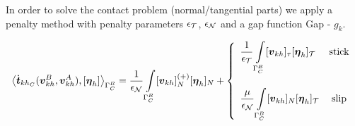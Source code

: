\documentclass[12pt,a4paper]{scrbook}
\begin{document}
% 
%  
%  
%  
%  
%  
%  
%  
%  
%  
% 
% 
In order to solve the contact problem  (normal/tangential parts) we apply a penalty method with penalty  parameters  $\epsilon_{{\mathcal{T}}}$, $\epsilon_{{\mathcal{N}}}$ and a gap function Gap - $g_k$.

\begin{equation}\label{DotP}
\left\langle\dot{\mbox{\boldmath$t$}}_{kh_{C}} (\mbox{\boldmath$v$}_{kh}^{B},\mbox{\boldmath$v$}_{kh}^{A}), [\mbox{\boldmath$\eta$}_h]\right\rangle_{\Gamma^{B}_{C}}=\frac{1}{\epsilon_{{\mathcal{N}}}}\int\limits_{\Gamma^{B}_{C}} [\mbox{\boldmath$v$}_{kh}]^{(+)}_N[\mbox{\boldmath$\eta$}_h]_N+
\left\{
\begin{array}{lc}
\displaystyle\frac{1}{\epsilon_{{\mathcal{T}}}}\int\limits_{\Gamma^{B}_{C}} [\mbox{\boldmath$v$}_{kh}]_{\tau} [\mbox{\boldmath$\eta$}_h]_{{\mathcal{T}}}& \mbox{stick}\\[7ex]
\displaystyle\frac{\mu}{\epsilon_{{\mathcal{N}}}}\int\limits_{\Gamma^{B}_{C}} [\mbox{\boldmath$v$}_{kh}]_{N} [\mbox{\boldmath$\eta$}_h]_{{\mathcal{T}}}& \mbox{slip}
\end{array}
\right.
\end{equation}
\end{document}
